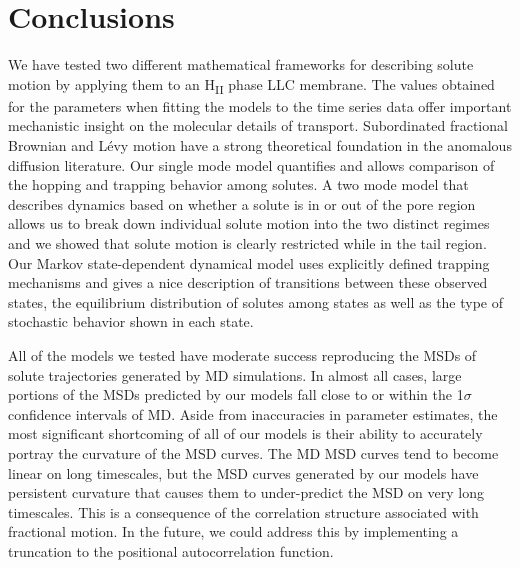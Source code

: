 \documentclass[12pt]{article}
\begin{document}

  \section{Conclusions}
  
  We have tested two different mathematical frameworks for describing solute
  motion by applying them to an H\textsubscript{II} phase LLC membrane. The values
  obtained for the parameters when fitting the models to the time series data 
  offer important mechanistic insight on the molecular details of transport.
  Subordinated fractional Brownian and L\'evy motion have a 
  strong theoretical 
  foundation in the anomalous diffusion literature. Our single mode model
  quantifies and allows comparison of the hopping and trapping behavior 
  among solutes. A two mode model that describes dynamics based on whether
  a solute is in or out of the pore region allows us to break down individual
  solute motion into the two distinct regimes and we showed that solute motion is
  clearly restricted while in the tail region. Our Markov state-dependent dynamical
  model uses explicitly defined trapping mechanisms and gives a nice description 
  of transitions between these observed states, the equilibrium distribution of 
  solutes among states as well as the type of stochastic behavior shown in each 
  state. 
  
  All of the models we tested have moderate success reproducing the MSDs of
  solute trajectories generated by MD simulations. In almost all cases, large 
  portions of the MSDs predicted by our models fall close to or within the 1$\sigma$
  confidence intervals of MD. Aside from inaccuracies in parameter estimates,
  the most significant shortcoming of all of our models is their ability to 
  accurately portray the curvature of the MSD curves. The MD MSD curves tend to 
  become linear on long timescales, but the MSD curves generated by our models
  have persistent curvature that causes them to under-predict the MSD on very
  long timescales. This is a consequence of the correlation structure associated
  with fractional motion. In the future, we could address this by 
  implementing a truncation to the positional autocorrelation function.
  
\end{document}
